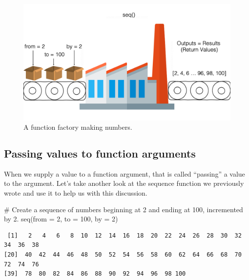 \documentclass[
  letterpaper,
  DIV=11,
  numbers=noendperiod]{scrreprt}
\newenvironment{Shaded}{\begin{snugshade}}{\end{snugshade}}
\newcommand{\AttributeTok}[1]{\textcolor[rgb]{0.40,0.45,0.13}{#1}}
\newcommand{\CommentTok}[1]{\textcolor[rgb]{0.37,0.37,0.37}{#1}}
\newcommand{\DecValTok}[1]{\textcolor[rgb]{0.68,0.00,0.00}{#1}}
\newcommand{\FunctionTok}[1]{\textcolor[rgb]{0.28,0.35,0.67}{#1}}
\newcommand{\NormalTok}[1]{\textcolor[rgb]{0.00,0.23,0.31}{#1}}
\begin{document}
\begin{figure}[H]

{\centering \includegraphics{chapters/speaking_r/factory2.png}

}

\caption{A function factory making numbers.}

\end{figure}%

\subsection{Passing values to function
arguments}\label{passing-values-to-function-arguments}

When we supply a value to a function argument, that is called
``passing'' a value to the argument. Let's take another look at the
sequence function we previously wrote and use it to help us with this
discussion.

\begin{Shaded}
\begin{Highlighting}[]
\CommentTok{\# Create a sequence of numbers beginning at 2 and ending at 100, incremented by 2.}
\FunctionTok{seq}\NormalTok{(}\AttributeTok{from =} \DecValTok{2}\NormalTok{, }\AttributeTok{to =} \DecValTok{100}\NormalTok{, }\AttributeTok{by =} \DecValTok{2}\NormalTok{)}
\end{Highlighting}
\end{Shaded}

\begin{verbatim}
 [1]   2   4   6   8  10  12  14  16  18  20  22  24  26  28  30  32  34  36  38
[20]  40  42  44  46  48  50  52  54  56  58  60  62  64  66  68  70  72  74  76
[39]  78  80  82  84  86  88  90  92  94  96  98 100
\end{verbatim}
\end{document}
